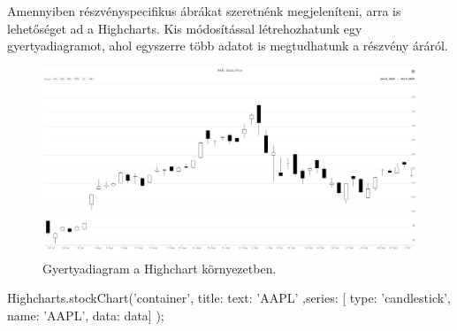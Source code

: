 Amennyiben részvényspecifikus ábrákat szeretnénk megjeleníteni, arra is lehetőséget ad a Highcharts. Kis módosítással létrehozhatunk egy gyertyadiagramot, ahol egyszerre több adatot is megtudhatunk a részvény áráról.
\begin{figure}[ht]
\centering
\includegraphics[scale=0.22]{images/highchart_stock.png}
\caption{Gyertyadiagram a Highchart környezetben.}
\label{fig:highchart_stock}
\end{figure}

\begin{javascript}
Highcharts.stockChart('container', {
    title: {
      text: 'AAPL'
    },series: [{
      type: 'candlestick',
      name: 'AAPL',
      data: data}]
});
\end{javascript} 